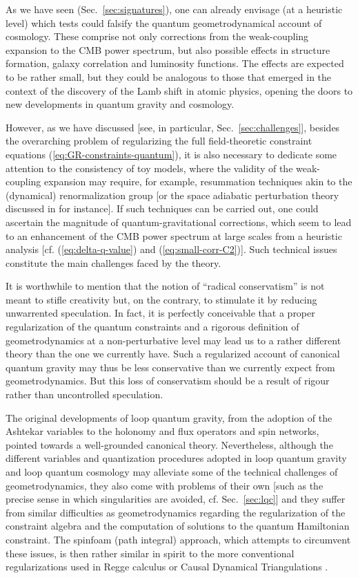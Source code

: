 \documentclass[12pt]{iopart}
\def\eref#1{(\ref{eq:#1})}
\begin{document}
As we have seen (Sec.~\ref{sec:signatures}), one can already envisage (at a heuristic level) which tests could falsify the quantum geometrodynamical account of cosmology. These comprise not only corrections from the weak-coupling expansion to the CMB power spectrum, but also possible effects in structure formation, galaxy correlation and luminosity functions. The effects are expected to be rather small, but they could be analogous to those that emerged in the context of the discovery of the Lamb shift in atomic physics, opening the doors to new developments in quantum gravity and cosmology.

However, as we have discussed [see, in particular, Sec.~\ref{sec:challenges}], besides the overarching problem of regularizing the full field-theoretic constraint equations \eref{GR-constraints-quantum}, it is also necessary to dedicate some attention to the consistency of toy models, where the validity of the weak-coupling expansion may require, for example, resummation techniques akin to the (dynamical) renormalization group [or the space adiabatic perturbation theory discussed in \citet{Stottmeister:2015tua} for instance]. If such techniques can be carried out, one could ascertain the magnitude of quantum-gravitational corrections, which seem to lead to an enhancement of the CMB power spectrum at large scales from a heuristic analysis [cf. \eref{delta-q-value} and \eref{small-corr-C2}]. Such technical issues constitute the main challenges faced by the theory.

It is worthwhile to mention that the notion of ``radical conservatism'' is not meant to stifle creativity but, on the contrary, to stimulate it by reducing unwarrented speculation. In fact, it is perfectly conceivable that a proper regularization of the quantum constraints and a rigorous definition of geometrodynamics at a non-perturbative level may lead us to a rather different theory than the one we currently have. Such a regularized account of canonical quantum gravity may thus be less conservative than we currently expect from geometrodynamics. But this loss of conservatism should be a result of rigour rather than uncontrolled speculation.

The original developments of loop quantum gravity, from the adoption of the Ashtekar variables to the holonomy and flux operators and spin networks, pointed towards a well-grounded canonical theory.  Nevertheless, although the different variables and quantization procedures adopted in loop quantum gravity and loop quantum cosmology may alleviate some of the technical challenges of geometrodynamics, they also come with problems of their own [such as the precise sense in which singularities are avoided, cf. Sec.~\ref{sec:lqc}] and they suffer from similar difficulties as geometrodynamics regarding the regularization of the constraint algebra and the computation of solutions to the quantum Hamiltonian constraint. The spinfoam (path integral) approach, which attempts to circumvent these issues, is then rather similar in spirit to the more conventional regularizations used in Regge calculus \citep{Williams:1996jb,Liu:2015bwa} or Causal Dynamical Triangulations \citep{Ambjorn:1998xu,Ambjorn:2022naa}.
\end{document}
